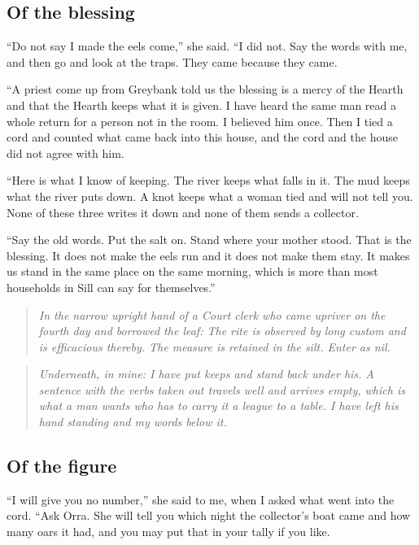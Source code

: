 \documentclass{design/chronicle}
\begin{document}
\subsection*{Of the blessing}

“Do not say I made the eels come,” she said. “I did not. Say the words with me, and then go and look at the traps. They came because they came.

“A priest come up from Greybank told us the blessing is a mercy of the Hearth and that the Hearth keeps what it is given. I have heard the same man read a whole return for a person not in the room. I believed him once. Then I tied a cord and counted what came back into this house, and the cord and the house did not agree with him.

“Here is what I know of keeping. The river keeps what falls in it. The mud keeps what the river puts down. A knot keeps what a woman tied and will not tell you. None of these three writes it down and none of them sends a collector.

“Say the old words. Put the salt on. Stand where your mother stood. That is the blessing. It does not make the eels run and it does not make them stay. It makes us stand in the same place on the same morning, which is more than most households in Sill can say for themselves.”

\begin{quote}\itshape \emph{In the narrow upright hand of a Court clerk who came upriver on the fourth day and borrowed the leaf:} The rite is observed by long custom and is efficacious thereby. The measure is retained in the silt. Enter as nil.\end{quote}

\begin{quote}\itshape *\end{quote}

\begin{quote}\itshape \emph{Underneath, in mine:} I have put \emph{keeps} and \emph{stand} back under his. A sentence with the verbs taken out travels well and arrives empty, which is what a man wants who has to carry it a league to a table. I have left his hand standing and my words below it.\end{quote}

\subsection*{Of the figure}

“I will give you no number,” she said to me, when I asked what went into the cord. “Ask Orra. She will tell you which night the collector’s boat came and how many oars it had, and you may put that in your tally if you like.
\end{document}
